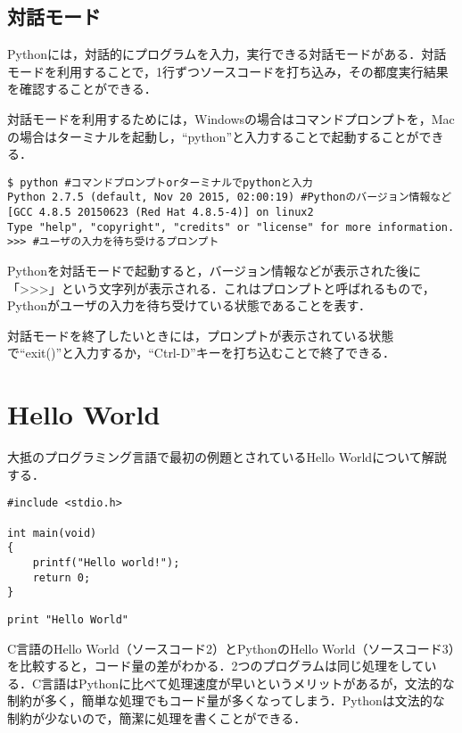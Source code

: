 \subsection{対話モード}
Pythonには，対話的にプログラムを入力，実行できる対話モードがある．対話モードを利用することで，1行ずつソースコードを打ち込み，その都度実行結果を確認することができる．


対話モードを利用するためには，Windowsの場合はコマンドプロンプトを，Macの場合はターミナルを起動し，``python''と入力することで起動することができる．


\begin{lstlisting}[caption=対話モード,label=interactive_mode]
$ python #コマンドプロンプトorターミナルでpythonと入力
Python 2.7.5 (default, Nov 20 2015, 02:00:19) #Pythonのバージョン情報など
[GCC 4.8.5 20150623 (Red Hat 4.8.5-4)] on linux2
Type "help", "copyright", "credits" or "license" for more information.
>>> #ユーザの入力を待ち受けるプロンプト
\end{lstlisting}

Pythonを対話モードで起動すると，バージョン情報などが表示された後に「\textgreater\textgreater\textgreater」という文字列が表示される．これはプロンプトと呼ばれるもので，Pythonがユーザの入力を待ち受けている状態であることを表す．


対話モードを終了したいときには，プロンプトが表示されている状態で``exit()''と入力するか，``Ctrl-D''キーを打ち込むことで終了できる．


\section{Hello World}
大抵のプログラミング言語で最初の例題とされているHello Worldについて解説する．


\begin{lstlisting}[caption=C言語のHello World,label=hello_C]
#include <stdio.h>
 
int main(void)
{
    printf("Hello world!");
    return 0;
}
\end{lstlisting}


\begin{lstlisting}[caption=PythonのHello World,label=hello_Python]
print "Hello World"
\end{lstlisting}


C言語のHello World（ソースコード2）とPythonのHello World（ソースコード3）を比較すると，コード量の差がわかる．2つのプログラムは同じ処理をしている．C言語はPythonに比べて処理速度が早いというメリットがあるが，文法的な制約が多く，簡単な処理でもコード量が多くなってしまう．Pythonは文法的な制約が少ないので，簡潔に処理を書くことができる．


